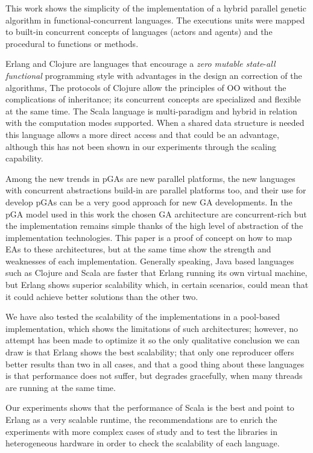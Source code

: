 
This work shows the simplicity of the implementation  of a hybrid
parallel genetic algorithm in functional-concurrent languages. The
executions units were mapped to built-in concurrent concepts of languages
(actors and agents) and the procedural to functions or methods. 

Erlang and Clojure are languages that encourage a \emph{zero mutable
  state}-\emph{all functional} programming style with advantages in
the design an correction of the algorithms, The protocols of Clojure
allow the principles of OO without the complications of inheritance;
its concurrent concepts  are specialized and flexible at the same
time. The Scala language is multi-paradigm and hybrid in relation with
the computation modes supported. When a shared data structure is
needed this language allows a more direct access and that could be an
advantage, although this has not been shown in our experiments through
the scaling capability. 

Among the new trends in pGAs are new parallel platforms, the new
languages with concurrent abstractions build-in are parallel platforms
too, and their use for develop pGAs can be a very good approach for
new GA developments. In the pGA model used in this work the chosen GA
architecture are concurrent-rich but the implementation remains simple
thanks of the high level of abstraction of the implementation
technologies. This paper is a proof of concept on how to map EAs to
these architectures, but at the same time show the strength and
weaknesses of each implementation. Generally speaking, Java based
languages such as Clojure and Scala are faster that Erlang running its
own virtual machine, but Erlang shows superior scalability which, in
certain scenarios, could mean that it could achieve better solutions
than the other two. 

We have also tested the scalability of the implementations in a
pool-based implementation, which shows the limitations of such
architectures; however, no attempt has been made to optimize it so the
only qualitative conclusion we can draw is that Erlang shows the best
scalability; that only one reproducer offers better results than two
in all cases, and that a good thing about these languages is that
performance does not suffer, but degrades gracefully, when many
threads are running at the same time. 

Our experiments shows that the performance of Scala is the best and
point to Erlang as a very scalable runtime, the recommendations are
to enrich the experiments with more complex cases of study and to test
the libraries in heterogeneous hardware in order to check the scalability
of each language. 

